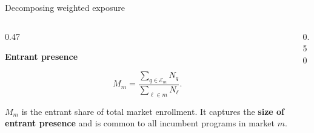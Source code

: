 \documentclass{beamer}
\begin{document}
\begin{frame}{Decomposing weighted exposure}

\scriptsize
\setlength{\abovedisplayskip}{3pt}
\setlength{\belowdisplayskip}{3pt}

\begin{center}
\end{center}

\vspace{0.05cm}


\begin{columns}[T,onlytextwidth]

\begin{column}{0.47\textwidth}

\textbf{Entrant presence}

\tiny
\[
M_m
=
\frac{
\sum_{q\in\mathcal E_m}N_q
}{
\sum_{\ell\in m}N_\ell
}.
\]

\tiny
\(M_m\) is the entrant share of total market enrollment. It captures the
\textbf{size of entrant presence} and is common to all incumbent programs
in market \(m\).

\end{column}

\begin{column}{0.50\textwidth}


\end{column}
\end{columns}
\end{frame}
\end{document}
